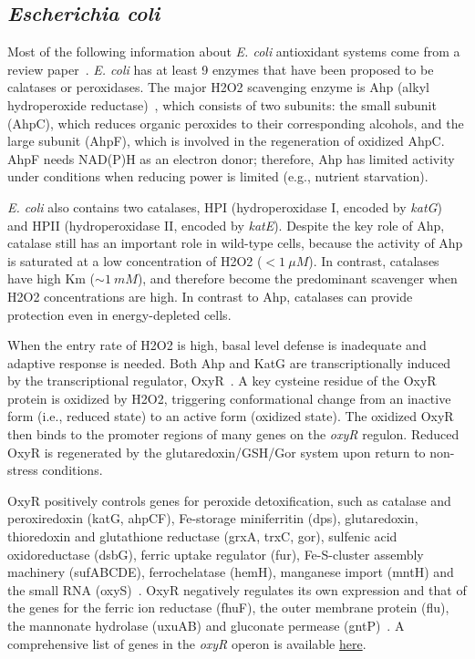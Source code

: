 \documentclass[10pt]{article}
\begin{document}
\subsection{\textit{Escherichia coli}}

Most of the following information about \textit{E. coli} antioxidant systems come from a review paper~\cite{mishra2012bacteria}. \textit{E. coli} has at least 9 enzymes that have been proposed to be calatases or peroxidases. The major H2O2 scavenging enzyme is Ahp (alkyl hydroperoxide reductase)~\cite{seaver2001alkyl}, which consists of two subunits: the small subunit (AhpC), which reduces organic peroxides to their corresponding alcohols, and the large subunit (AhpF), which is involved in the regeneration of oxidized AhpC. AhpF needs NAD(P)H as an electron donor; therefore, Ahp has limited activity under conditions when reducing power is limited (e.g., nutrient starvation).

\textit{E. coli} also contains two catalases, HPI (hydroperoxidase I, encoded by \textit{katG}) and HPII (hydroperoxidase II, encoded by \textit{katE}). Despite the key role of Ahp, catalase still has an important role in wild-type cells, because the activity of Ahp is saturated at a low concentration of H2O2 ($< 1~\mu M$). In contrast, catalases have high Km ($\sim 1~mM$), and therefore become the predominant scavenger when H2O2 concentrations are high. In contrast to Ahp, catalases can provide protection even in energy-depleted cells.

When the entry rate of H2O2 is high, basal level defense is inadequate and adaptive response is needed. Both Ahp and KatG are transcriptionally induced by the transcriptional regulator, OxyR~\cite{hillion2015thiol}. A key cysteine residue of the OxyR protein is oxidized by H2O2, triggering conformational change from an inactive form (i.e., reduced state) to an active form (oxidized state). The oxidized OxyR then binds to the promoter regions of many genes on the \textit{oxyR} regulon. Reduced OxyR is regenerated by the glutaredoxin/GSH/Gor system upon return to non-stress conditions.  

OxyR positively controls genes for peroxide detoxification, such as catalase and peroxiredoxin (katG, ahpCF), Fe-storage miniferritin (dps), glutaredoxin, thioredoxin and glutathione reductase (grxA, trxC, gor), sulfenic acid oxidoreductase (dsbG), ferric uptake regulator (fur), Fe-S-cluster assembly machinery (sufABCDE), ferrochelatase (hemH), manganese import (mntH) and the small RNA (oxyS)~\cite{hillion2015thiol}. OxyR negatively regulates its own expression and that of the genes for the ferric ion reductase (fhuF), the outer membrane protein (flu), the mannonate hydrolase (uxuAB) and gluconate permease (gntP)~\cite{hillion2015thiol}. A comprehensive list of genes in the \textit{oxyR} operon is available \href{https://ecocyc.org/gene?orgid=ECOLI\&id=EG10681\#tab=REGULON}{here}. 
\end{document}
